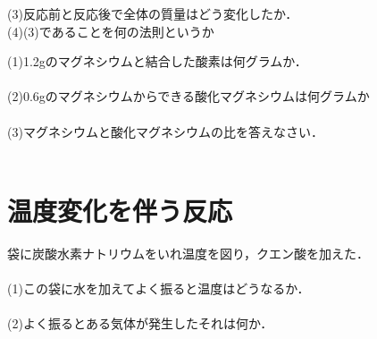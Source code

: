 \documentclass[autodetect-engine,dvi=dvipdfmx,ja=standard,
               a4j,11pt]{bxjsarticle}
\begin{document}
    (3)反応前と反応後で全体の質量はどう変化したか．\\

    (4)(3)であることを何の法則というか\\
\clearpage

  \begin{figure}[htb]
        \centering
        \vspace{20pt} %
        \caption{}
\end{figure}  
 (1)1.2gのマグネシウムと結合した酸素は何グラムか．\\\\

 (2)0.6gのマグネシウムからできる酸化マグネシウムは何グラムか\\\\

 (3)マグネシウムと酸化マグネシウムの比を答えなさい．   \\\\

 \section{温度変化を伴う反応}
 袋に炭酸水素ナトリウムをいれ温度を図り，クエン酸を加えた．\\\\
 
 (1)この袋に水を加えてよく振ると温度はどうなるか．\\\\

 (2)よく振るとある気体が発生したそれは何か．
\end{document}
